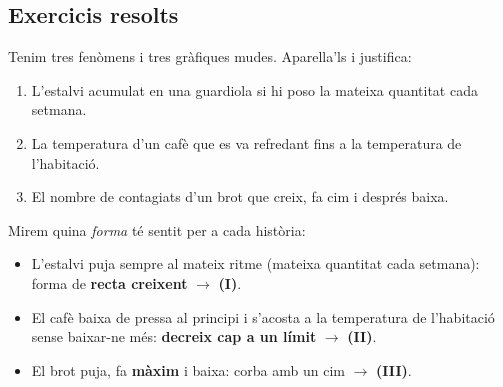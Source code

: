 \subsection{Exercicis resolts}

\begin{exresolt}
Tenim tres fenòmens i tres gràfiques mudes. Aparella'ls i justifica:
\begin{enumerate}[label=\arabic*., leftmargin=1.6em]
  \item L'estalvi acumulat en una guardiola si hi poso la mateixa quantitat cada setmana.
  \item La temperatura d'un cafè que es va refredant fins a la temperatura de l'habitació.
  \item El nombre de contagiats d'un brot que creix, fa cim i després baixa.
\end{enumerate}

\begin{center}
\end{center}

\solucio
Mirem quina \emph{forma} té sentit per a cada història:
\begin{itemize}[leftmargin=1.4em, itemsep=2pt]
  \item L'estalvi puja sempre al mateix ritme (mateixa quantitat cada setmana):
        forma de \textbf{recta creixent} $\rightarrow$ \textbf{(I)}.
  \item El cafè baixa de pressa al principi i s'acosta a la temperatura de
        l'habitació sense baixar-ne més: \textbf{decreix cap a un límit}
        $\rightarrow$ \textbf{(II)}.
  \item El brot puja, fa \textbf{màxim} i baixa: corba amb un cim $\rightarrow$ \textbf{(III)}.
\end{itemize}
\end{exresolt}

